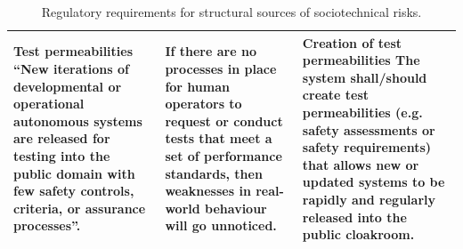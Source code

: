 \documentclass[lettersize,journal]{IEEEtran}
\begin{document}
\begin{landscape}
\begin{table}[]
\begin{tabular}{|p{0.3\textheight}|p{0.35\textheight}|p{0.35\textheight}|}
\hline
\textbf{Test permeabilities}
``New iterations of developmental or operational autonomous systems are released for testing into the public domain with few safety controls, criteria, or assurance processes”. \cite{macrae2021learning} & If there are no processes in place for human operators to request or conduct tests that meet a set of performance standards, then weaknesses in real-world behaviour will go unnoticed. & \textbf{Creation of test permeabilities} The system shall/should create test permeabilities (e.g. safety assessments or safety requirements) that allows new or updated systems to be rapidly and regularly released into the public cloakroom. \\
\hline
    \end{tabular}
    \caption{Regulatory requirements for structural sources of sociotechnical risks.}%
    \label{tab:reg_1}
\end{table}
\end{landscape}
\end{document}
